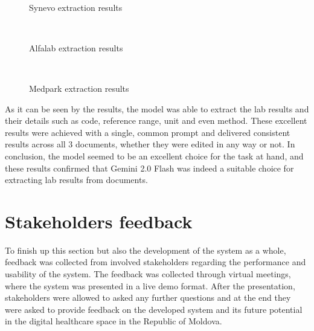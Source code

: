 \begin{figure}[ht]
    \centering
    \\[\baselineskip]
    \caption{Synevo extraction results}\label{fig:synevo}
\end{figure}

\begin{figure}[ht]
    \centering
    \\[\baselineskip]
    \caption{Alfalab extraction results}\label{fig:alfalab}
\end{figure}

\begin{figure}[ht]
    \centering
    \\[\baselineskip]
    \caption{Medpark extraction results}\label{fig:medpark}
\end{figure}

\FloatBarrier{}

As it can be seen by the results, the model was able to extract the lab results and their details such as code, reference range, unit and even method. These excellent results were achieved with a single, common prompt and delivered consistent results across all 3 documents, whether they were edited in any way or not. In conclusion, the model seemed to be an excellent choice for the task at hand, and these results confirmed that Gemini 2.0 Flash was indeed a suitable choice for extracting lab results from documents.

\section{Stakeholders feedback}

To finish up this section but also the development of the system as a whole, feedback was collected from involved stakeholders regarding the performance and usability of the system. The feedback was collected through virtual meetings, where the system was presented in a live demo format. After the presentation, stakeholders were allowed to asked any further questions and at the end they were asked to provide feedback on the developed system and its future potential in the digital healthcare space in the Republic of Moldova. 

